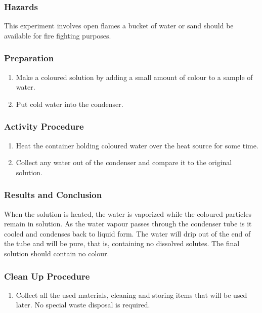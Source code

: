 \subsubsection*{Hazards}
This experiment involves open flames a bucket of water or sand should be available for fire fighting purposes.


\subsubsection*{Preparation}
\begin{enumerate}
\item{Make a coloured solution by adding a small amount of colour to a sample of water.}
\item{Put cold water into the condenser.}
\end{enumerate}

\subsubsection*{Activity Procedure}
\begin{enumerate}
\item{Heat the container holding coloured water over the heat source for some time.}
\item{Collect any water out of the condenser and compare it to the original solution.}
\end{enumerate}

\subsubsection*{Results and Conclusion}
When the solution is heated, the water is vaporized while the coloured particles remain in solution. As the water vapour passes through the condenser tube is it cooled and condenses back to liquid form. The water will drip out of the end of the tube and will be pure, that is, containing no dissolved solutes. The final solution should contain no colour.

\subsubsection*{Clean Up Procedure}
\begin{enumerate}
\item{Collect all the used materials, cleaning and storing items that will be used later. No special waste disposal is required.}
\end{enumerate}

